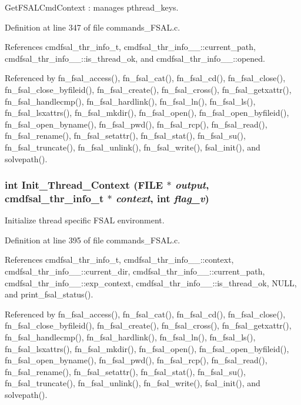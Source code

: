 Get\-FSALCmd\-Context : manages pthread\_\-keys. 

Definition at line 347 of file commands\_\-FSAL.c.

References cmdfsal\_\-thr\_\-info\_\-t, cmdfsal\_\-thr\_\-info\_\-\_\-::current\_\-path, cmdfsal\_\-thr\_\-info\_\-\_\-::is\_\-thread\_\-ok, and cmdfsal\_\-thr\_\-info\_\-\_\-::opened.

Referenced by fn\_\-fsal\_\-access(), fn\_\-fsal\_\-cat(), fn\_\-fsal\_\-cd(), fn\_\-fsal\_\-close(), fn\_\-fsal\_\-close\_\-byfileid(), fn\_\-fsal\_\-create(), fn\_\-fsal\_\-cross(), fn\_\-fsal\_\-getxattr(), fn\_\-fsal\_\-handlecmp(), fn\_\-fsal\_\-hardlink(), fn\_\-fsal\_\-ln(), fn\_\-fsal\_\-ls(), fn\_\-fsal\_\-lsxattrs(), fn\_\-fsal\_\-mkdir(), fn\_\-fsal\_\-open(), fn\_\-fsal\_\-open\_\-byfileid(), fn\_\-fsal\_\-open\_\-byname(), fn\_\-fsal\_\-pwd(), fn\_\-fsal\_\-rcp(), fn\_\-fsal\_\-read(), fn\_\-fsal\_\-rename(), fn\_\-fsal\_\-setattr(), fn\_\-fsal\_\-stat(), fn\_\-fsal\_\-su(), fn\_\-fsal\_\-truncate(), fn\_\-fsal\_\-unlink(), fn\_\-fsal\_\-write(), fsal\_\-init(), and solvepath().
\subsubsection{\setlength{\rightskip}{0pt plus 5cm}int Init\_\-Thread\_\-Context (FILE $\ast$ {\em output}, {\bf cmdfsal\_\-thr\_\-info\_\-t} $\ast$ {\em context}, int {\em flag\_\-v})}\label{commands__FSAL_8c_a13}


Initialize thread specific FSAL environment. 

Definition at line 395 of file commands\_\-FSAL.c.

References cmdfsal\_\-thr\_\-info\_\-t, cmdfsal\_\-thr\_\-info\_\-\_\-::context, cmdfsal\_\-thr\_\-info\_\-\_\-::current\_\-dir, cmdfsal\_\-thr\_\-info\_\-\_\-::current\_\-path, cmdfsal\_\-thr\_\-info\_\-\_\-::exp\_\-context, cmdfsal\_\-thr\_\-info\_\-\_\-::is\_\-thread\_\-ok, NULL, and print\_\-fsal\_\-status().

Referenced by fn\_\-fsal\_\-access(), fn\_\-fsal\_\-cat(), fn\_\-fsal\_\-cd(), fn\_\-fsal\_\-close(), fn\_\-fsal\_\-close\_\-byfileid(), fn\_\-fsal\_\-create(), fn\_\-fsal\_\-cross(), fn\_\-fsal\_\-getxattr(), fn\_\-fsal\_\-handlecmp(), fn\_\-fsal\_\-hardlink(), fn\_\-fsal\_\-ln(), fn\_\-fsal\_\-ls(), fn\_\-fsal\_\-lsxattrs(), fn\_\-fsal\_\-mkdir(), fn\_\-fsal\_\-open(), fn\_\-fsal\_\-open\_\-byfileid(), fn\_\-fsal\_\-open\_\-byname(), fn\_\-fsal\_\-pwd(), fn\_\-fsal\_\-rcp(), fn\_\-fsal\_\-read(), fn\_\-fsal\_\-rename(), fn\_\-fsal\_\-setattr(), fn\_\-fsal\_\-stat(), fn\_\-fsal\_\-su(), fn\_\-fsal\_\-truncate(), fn\_\-fsal\_\-unlink(), fn\_\-fsal\_\-write(), fsal\_\-init(), and solvepath().
